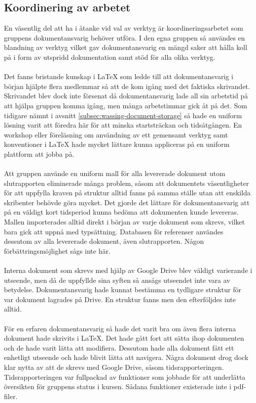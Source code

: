 \subsection{Koordinering av arbetet}
\label{subsec:wassing-coordination-of-work}
En väsentlig del att ha i åtanke vid val av verktyg är koordineringsarbetet som gruppens dokumentansvarig behöver utföra. I den egna gruppen så användes en blandning av verktyg vilket gav dokumentansvarig en mängd saker att hålla koll på i form av utspridd dokumentation samt stöd för alla olika verktyg.
\\ \\
Det fanns bristande kunskap i LaTeX som ledde till att dokumentansvarig i början hjälpte flera medlemmar så att de kom igång med det faktiska skrivandet. Skrivandet blev dock inte försenat då dokumentansvarig lade all sin arbetstid på att hjälpa gruppen komma igång, men många arbetstimmar gick åt på det. Som tidigare nämnt i avsnitt \ref{subsec:wassing-document-storage} så hade en uniform lösning varit att föredra här för att minska startsträckan och tidsåtgången. 
En workshop eller föreläsning om användning av ett gemensamt verktyg samt konventioner i LaTeX hade mycket lättare kunna appliceras på en uniform plattform att jobba på.
\\ \\
Att gruppen använde en uniform mall för alla levererade dokument utom slutrapporten eliminerade många problem, såsom att dokumentets väsentligheter för att uppfylla kraven på struktur alltid fanns på samma ställe utan att enskilda skribenter behövde göra mycket. Det gjorde det lättare för dokumentansvarig att på en väldigt kort tidsperiod kunna bedöma att dokumenten kunde levereras. Mallen importerades alltid direkt i början av varje dokument som skrevs, vilket bara gick att uppnå med typsättning. Databasen för referenser användes dessutom av alla levererade dokument, även slutrapporten. Någon förbättringsmöjlighet sågs inte här.
\\ \\
Interna dokument som skrevs med hjälp av Google Drive blev väldigt varierande i utseende, men då de uppfyllde sina syften så ansågs utseendet inte vara av betydelse. Dokumentansvarig hade kunnat bestämma en tydligare struktur för var dokument lagrades på Drive. En struktur fanns men den efterföljdes inte alltid.
\\ \\
För en erfaren dokumentansvarig så hade det varit bra om även flera interna dokument hade skrivits i LaTeX. Det hade gått fort att sätta ihop dokumenten och de hade varit lätta att modifiera. Dessutom hade alla dokument fått ett enhetligt utseende och hade blivit lätta att navigera. Några dokument drog dock klar nytta av att de skrevs med Google Drive, såsom tidsrapporteringen. Tidsrapporteringen var fullpackad av funktioner som jobbade för att underlätta översikten för gruppens status i kursen. Sådana funktioner existerade inte i pdf-filer.
